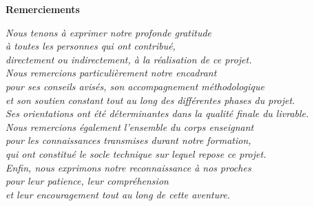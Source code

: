 \clearpage
\thispagestyle{empty}

\begin{center}
{\fontsize{24}{29}\selectfont\bfseries Remerciements}
\end{center}

\vspace{2cm}

\begin{center}
{\fontsize{16}{20}\selectfont\itshape
Nous tenons à exprimer notre profonde gratitude\\
à toutes les personnes qui ont contribué,\\
directement ou indirectement, à la réalisation de ce projet.\\[0.8cm]
Nous remercions particulièrement notre encadrant\\
pour ses conseils avisés, son accompagnement méthodologique\\
et son soutien constant tout au long des différentes phases du projet.\\
Ses orientations ont été déterminantes dans la qualité finale du livrable.\\[0.8cm]
Nous remercions également l'ensemble du corps enseignant\\
pour les connaissances transmises durant notre formation,\\
qui ont constitué le socle technique sur lequel repose ce projet.\\[0.8cm]
Enfin, nous exprimons notre reconnaissance à nos proches\\
pour leur patience, leur compréhension\\
et leur encouragement tout au long de cette aventure.
}
\end{center}

\clearpage
